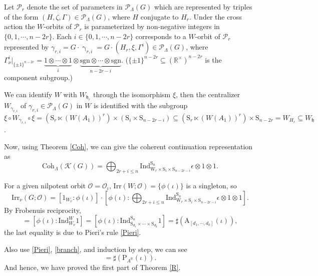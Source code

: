 \documentclass[12pt, a4paper]{amsart}
\numberwithin{equation}{section}
\newcommand{\BR}{{\mathbb {R}}}
\newcommand{\CK}{{\mathcal {K}}}
\newcommand{\CO}{{\mathcal {O}}}
\newcommand{\CP}{{\mathcal {P}}}
\newcommand{\fh}{\mathfrak{h}}
\newcommand{\A}{{\mathrm{A}}}
\newcommand{\Ind}{{\mathrm{Ind}}}
\newcommand{\Irr}{{\mathrm{Irr}}}
\newcommand{\sgn}{{\mathrm{sgn}}}
\begin{document}
Let $\CP_r$ denote the set of parameters in $\CP_{\Lambda}(G)$ which are represented by triples of the form $(H,\zeta,\Gamma) \in \mathscr{P}_{\Lambda}(G)$, where $H$ conjugate to $H_r$. Under the cross action the $W$-orbits of $\CP_r$ is parameterized by non-negative integers in $\{0,1,\cdots,n-2r\}$. Each $i \in \{0,1,\cdots,n-2r\}$ corresponds to a $W$-orbit of $\CP_r$ represented by $\gamma_{r,i} = G \cdot \upgamma_{r,i} = G \cdot (H_r,\xi,\Gamma^i) \in \CP_{\Lambda}(G)$, where $\Gamma_{\nu}^i|_{\{\pm1\}^{n-2r}} = \underbrace{1 \otimes \cdots \otimes 1}_{i} \otimes \underbrace{\sgn \otimes \cdots \otimes \sgn }_{n-2r-i}$. ($\{\pm1\}^{n-2r} \subseteq (\BR^\times)^{n-2r}$ is the component subgroup.)

We can identify $W$ with $W_{\fh_r}$ through the isomorphism $\xi$, then the centralizer $W_{{\gamma_{r,i}}}$ of ${\gamma_{r,i}} \in \CP_{\Lambda}(G)$ in $W$ is identified with the subgroup $\xi \circ W_{{\gamma_{r,i}}}\circ \xi = (\mathrm{S}_{r} \ltimes (W(A_1))^r) \times (\mathrm{S}_{i} \times \mathrm{S}_{n-2r-i}) \subseteq (\mathrm{S}_{r} \ltimes (W(A_1))^r) \times \mathrm{S}_{n-2r} = W_{H_r} \subseteq W_{\fh}$.

Now, using Theorem \ref{Coh}, we can give the coherent continuation representation as
\begin{equation}
    \mathrm{Coh}_{\Lambda}(\CK(G)) = \bigoplus_{2r + i \leq n} \Ind _{\mathrm{W}_{r} \times \mathrm{S}_{i} \times \mathrm{S}_{n-2r-i}}^{\mathrm{S}_{n}} \epsilon \otimes 1 \otimes 1.
\end{equation}

For a given nilpotent orbit $\CO = \CO_{\iota}$, $\Irr(W;\CO) = \{\phi(\iota)\}$ is a singleton, so 
\begin{equation}
    \Irr_{\nu}(G;\CO) = [1_{W_v}: \phi(\iota)]\cdot [\phi(\iota): \bigoplus_{2r + i \leq n} \Ind _{\mathrm{W}_{r} \times \mathrm{S}_{i} \times \mathrm{S}_{n-2r-i}}^{\mathrm{S}_{n}} \epsilon \otimes 1 \otimes 1].
\end{equation}
By Frobenuis reciprocity, 
\begin{equation}
[1_{W_\nu}: \phi(\iota)] = [\phi(\iota): \Ind_{W_\nu}^{W}1] = [\phi(\iota): \Ind_{\mathrm{S}_{d_1} \times \cdots \times \mathrm{S}_{d_k}}^{\mathrm{S}_n}1] = \sharp(\A_{[d_1,\cdots,d_k]}(\iota)),
\end{equation}
the last equality is due to Pieri's rule \ref{Pieri}.

Also use \ref{Pieri}, \ref{branch}, and induction by step, we can see
\begin{equation}
    [\phi(\iota): \bigoplus_{2r + i \leq n} \Ind _{\mathrm{W}_{r} \times \mathrm{S}_{i} \times \mathrm{S}_{n-2r-i}}^{\mathrm{S}_{n}} \epsilon \otimes 1 \otimes 1] = \sharp(\mathrm{P}_{A^\BR}(\iota)).
\end{equation}
And hence, we have proved the first part of Theorem \ref{R}.
\end{document}
